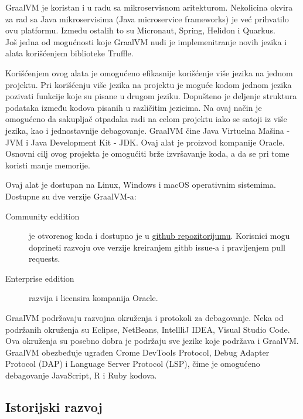 \documentclass[a4paper]{article}
\begin{document}
GraalVM je koristan i u radu sa mikroservisnom aritekturom. Nekolicina okvira za rad sa Java mikroservisima  (Java microservice frameworks) je već prihvatilo ovu platformu. Između ostalih to su Micronaut, Spring, Helidon i Quarkus. \\

Još jedna od mogućnosti koje GraalVM nudi je implemenitranje novih jezika i alata korišćenjem biblioteke Truffle.

Korišćenjem ovog alata je omogućeno efikasnije korišćenje više jezika na jednom projektu. Pri korišćenju više jezika na projektu je moguće kodom jednom jezika pozivati funkcije koje su pisane u drugom jeziku. Dopušteno je deljenje struktura podataka između kodova pisanih u različitim jezicima. Na ovaj način je omogućeno da sakupljač otpadaka radi na celom projektu iako se satoji iz više jezika, kao i jednostavnije debagovanje.
GraalVM čine Java Virtuelna Mašina - JVM i Java Development Kit - JDK. Ovaj alat je proizvod kompanije Oracle. Osnovni cilj ovog projekta je omogućiti brže izvršavanje koda, a da se pri tome koristi manje memorije.

Ovaj alat je dostupan na Linux, Windows i macOS operativnim sistemima. \\

Dostupne su dve verzije GraalVM-a:

\begin{description}
	\item [Community eddition] je otvorenog koda i dostupno je u \href{https://github.com/oracle/graal}{github repozitorijumu}. Korisnici mogu doprineti razvoju ove verzije kreiranjem githb issue-a i pravljenjem pull requests.
	\item [Enterprise eddition] razvija i licensira kompanija Oracle.
\end{description}

GraalVM podržavaju razvojna okruženja i protokoli za debagovanje. Neka od podržanih okruženja su Eclipse, NetBeans, IntellliJ IDEA, Visual Studio Code. Ova okruženja su posebno dobra je podržaju sve jezike koje podržava i GraalVM. GraalVM obezbeđuje ugrađen Crome DevTools Protocol, Debug Adapter Protocol (DAP) i Language Server Protocol (LSP), čime je omogućeno debagovanje JavaScript, R i Ruby kodova.

\subsection{Istorijski razvoj}
\label{subsec:Istorijski razvoj}
\end{document}
